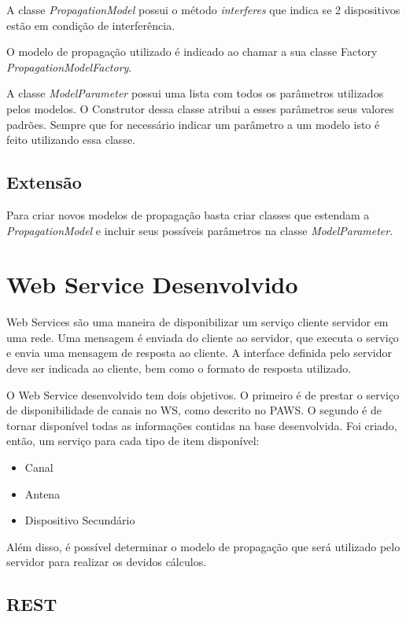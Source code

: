 A classe \textit{PropagationModel} possui o método \textit{interferes} que indica se 2 dispositivos estão em condição de interferência.

O modelo de propagação utilizado é indicado ao chamar a sua classe Factory \textit{PropagationModelFactory}.

A classe \textit{ModelParameter} possui uma lista com todos os parâmetros utilizados pelos modelos. O Construtor dessa classe atribui a esses parâmetros seus valores padrões. Sempre que for necessário indicar um parâmetro a um modelo isto é feito utilizando essa classe.

\subsection{Extensão}

Para criar novos modelos de propagação basta criar classes que estendam a \textit{PropagationModel} e incluir seus possíveis parâmetros na classe \textit{ModelParameter}.

\section{Web Service Desenvolvido}


Web Services são uma maneira de disponibilizar um serviço cliente servidor em uma rede. Uma mensagem é enviada do cliente ao servidor, que executa o serviço e envia uma mensagem de resposta ao cliente. A interface definida pelo servidor deve ser indicada ao cliente, bem como o formato de resposta utilizado.

O Web Service desenvolvido tem dois objetivos. O primeiro é de prestar o serviço de disponibilidade de canais no WS, como descrito no PAWS. O segundo é de tornar disponível todas as informações contidas na base desenvolvida. Foi criado, então, um serviço para cada tipo de item disponível:

\begin{itemize}
\item Canal
\item Antena
\item Dispositivo Secundário
\end{itemize}

Além disso, é possível determinar o modelo de propagação que será utilizado pelo servidor para realizar os devidos cálculos.


\subsection{REST}

